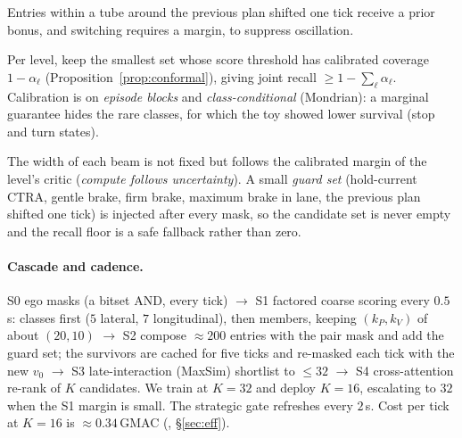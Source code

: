 \begin{description}[leftmargin=2.2em,style=nextline]
\item[R5 Hysteresis (soft).] Entries within a tube around the previous plan shifted one tick receive a prior bonus, and switching requires a margin, to suppress oscillation.
\item[R6 Conformal keep-sets (guarantee).] Per level, keep the smallest set whose score threshold has calibrated coverage $1-\alpha_\ell$ (Proposition~\ref{prop:conformal}), giving joint recall $\ge1-\sum_\ell\alpha_\ell$. Calibration is on \emph{episode blocks} and \emph{class-conditional} (Mondrian): a marginal guarantee hides the rare classes, for which the toy showed lower survival (stop and turn states).
\end{description}
The width of each beam is not fixed but follows the calibrated margin of the level's critic (\emph{compute follows uncertainty}). A small \emph{guard set} (hold-current CTRA, gentle brake, firm brake, maximum brake in lane, the previous plan shifted one tick) is injected after every mask, so the candidate set is never empty and the recall floor is a safe fallback rather than zero.

\paragraph{Cascade and cadence.}
S0 ego masks (a bitset AND, every tick) $\to$ S1 factored coarse scoring every $0.5$\,s: classes first ($5$ lateral, $7$ longitudinal), then members, keeping $(k_P,k_V)$ of about $(20,10)$ $\to$ S2 compose $\approx200$ entries with the pair mask and add the guard set; the survivors are cached for five ticks and re-masked each tick with the new $v_0$ $\to$ S3 late-interaction (MaxSim) shortlist to $\le32$ $\to$ S4 cross-attention re-rank of $K$ candidates. We train at $K=32$ and deploy $K=16$, escalating to $32$ when the S1 margin is small. The strategic gate refreshes every $2$\,s.
Cost per tick at $K=16$ is $\approx0.34$\,GMAC (\evE, \S\ref{sec:eff}).

